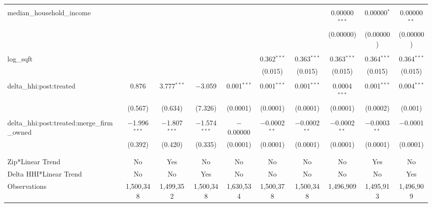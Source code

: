\begin{table}[H]
{\begin{tabular}{@{\extracolsep{5pt}}lccccccccc}
   & & & & & & & & & \\  

  median\_household\_income &  &  &  &  &  &  & 0.00000$^{***}$ & 0.00000$^{*}$ & 0.00000$^{**}$ \\  

   &  &  &  &  &  &  & (0.00000) & (0.00000) & (0.00000) \\  

   & & & & & & & & & \\  

  log\_sqft &  &  &  &  & 0.362$^{***}$ & 0.363$^{***}$ & 0.363$^{***}$ & 0.364$^{***}$ & 0.364$^{***}$ \\  

   &  &  &  &  & (0.015) & (0.015) & (0.015) & (0.015) & (0.015) \\  

   & & & & & & & & & \\  

  delta\_hhi:post:treated & 0.876 & 3.777$^{***}$ & $-$3.059 & 0.001$^{***}$ & 0.001$^{***}$ & 0.001$^{***}$ & 0.0004$^{***}$ & 0.001$^{***}$ & 0.004$^{***}$ \\  

   & (0.567) & (0.634) & (7.326) & (0.0001) & (0.0001) & (0.0001) & (0.0001) & (0.0002) & (0.001) \\  

   & & & & & & & & & \\  

  delta\_hhi:post:treated:merge\_firm\_owned & $-$1.996$^{***}$ & $-$1.807$^{***}$ & $-$1.574$^{***}$ & $-$0.00000 & $-$0.0002$^{**}$ & $-$0.0002$^{**}$ & $-$0.0002$^{**}$ & $-$0.0003$^{**}$ & $-$0.0001 \\  

   & (0.392) & (0.420) & (0.335) & (0.0001) & (0.0001) & (0.0001) & (0.0001) & (0.0001) & (0.0001) \\  

   & & & & & & & & & \\  

 \hline \\[-1.8ex]  

 Zip*Linear Trend & No & Yes & No & No & No & No & No & Yes & No \\  

 Delta HHI*Linear Trend & No & No & Yes & No & No & No & No & No & Yes \\  

 Observations & 1,500,348 & 1,499,352 & 1,500,348 & 1,630,534 & 1,500,378 & 1,500,348 & 1,496,909 & 1,495,913 & 1,496,909 \\  


\end{tabular}}
\end{table}
